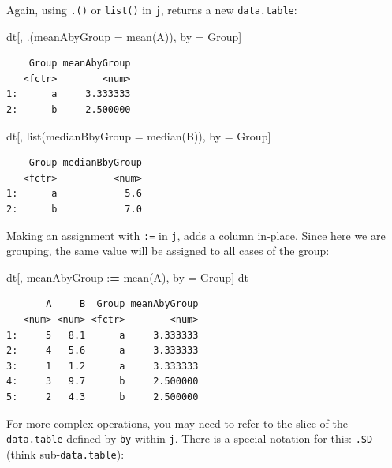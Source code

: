 \documentclass[
]{book}
\newenvironment{Shaded}{\begin{snugshade}}{\end{snugshade}}
\newcommand{\AttributeTok}[1]{\textcolor[rgb]{0.77,0.63,0.00}{#1}}
\newcommand{\ErrorTok}[1]{\textcolor[rgb]{0.64,0.00,0.00}{\textbf{#1}}}
\newcommand{\FunctionTok}[1]{\textcolor[rgb]{0.00,0.00,0.00}{#1}}
\newcommand{\NormalTok}[1]{#1}
\newcommand{\OtherTok}[1]{\textcolor[rgb]{0.56,0.35,0.01}{#1}}
\newcommand{\SpecialCharTok}[1]{\textcolor[rgb]{0.00,0.00,0.00}{#1}}
\begin{document}
Again, using \texttt{.()} or \texttt{list()} in \texttt{j}, returns a new \texttt{data.table}:

\begin{Shaded}
\begin{Highlighting}[]
\NormalTok{dt[, .(}\AttributeTok{meanAbyGroup =} \FunctionTok{mean}\NormalTok{(A)), by }\OtherTok{=}\NormalTok{ Group]}
\end{Highlighting}
\end{Shaded}

\begin{verbatim}
    Group meanAbyGroup
   <fctr>        <num>
1:      a     3.333333
2:      b     2.500000
\end{verbatim}

\begin{Shaded}
\begin{Highlighting}[]
\NormalTok{dt[, }\FunctionTok{list}\NormalTok{(}\AttributeTok{medianBbyGroup =} \FunctionTok{median}\NormalTok{(B)), by }\OtherTok{=}\NormalTok{ Group]}
\end{Highlighting}
\end{Shaded}

\begin{verbatim}
    Group medianBbyGroup
   <fctr>          <num>
1:      a            5.6
2:      b            7.0
\end{verbatim}

Making an assignment with \texttt{:=} in \texttt{j}, adds a column in-place. Since here we are grouping, the same value will be assigned to all cases of the group:

\begin{Shaded}
\begin{Highlighting}[]
\NormalTok{dt[, meanAbyGroup }\SpecialCharTok{:}\ErrorTok{=} \FunctionTok{mean}\NormalTok{(A), by }\OtherTok{=}\NormalTok{ Group]}
\NormalTok{dt}
\end{Highlighting}
\end{Shaded}

\begin{verbatim}
       A     B  Group meanAbyGroup
   <num> <num> <fctr>        <num>
1:     5   8.1      a     3.333333
2:     4   5.6      a     3.333333
3:     1   1.2      a     3.333333
4:     3   9.7      b     2.500000
5:     2   4.3      b     2.500000
\end{verbatim}

For more complex operations, you may need to refer to the slice of the \texttt{data.table} defined by \texttt{by} within \texttt{j}. There is a special notation for this: \texttt{.SD} (think sub-\texttt{data.table}):
\end{document}
